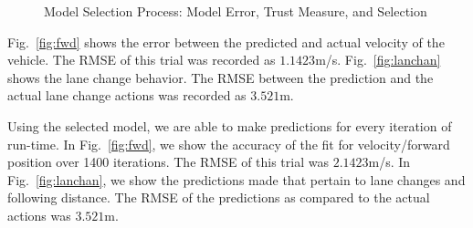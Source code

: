 \documentclass[letterpaper, 10 pt, conference]{ieeeconf}  %
\begin{document}
\begin{figure}[ht!]
	\centering
	\vspace{-5pt}
	\caption{Model Selection Process: Model Error, Trust Measure, and Selection}
	\label{fig:fitprocess}
	\vspace{-5pt}
\end{figure}

Fig.~\ref{fig:fwd} shows the error between the predicted and actual velocity of the vehicle. The RMSE of this trial was recorded as $1.1423$m/s.
Fig.~\ref{fig:lanchan} shows the lane change behavior. The RMSE between the prediction and the actual lane change actions was recorded as $3.521$m.

Using the selected model, we are able to make predictions for every iteration of run-time. In Fig.~\ref{fig:fwd}, we show the accuracy of the fit for velocity/forward position over 1400 iterations. The RMSE of this trial was $2.1423$m/s. 
In Fig.~\ref{fig:lanchan}, we show the predictions made that pertain to lane changes and following distance. The RMSE of the predictions as compared to the actual actions was $3.521$m. 
\end{document}
